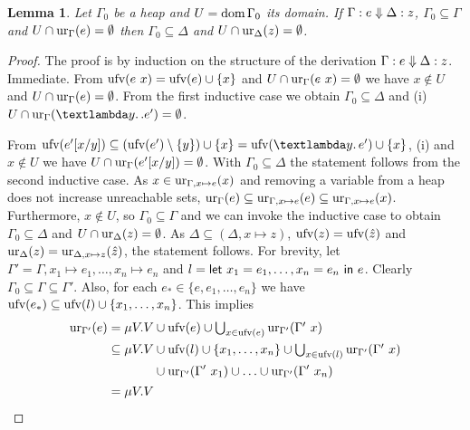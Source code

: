 \documentclass[preprint]{sigplanconf}
\newtheorem{lemma}[theorem]{Lemma}
\theoremstyle{nonumberplain}
\newtheorem{proof}{Proof}
\begin{document}
\begin{lemma}
Let $\Gamma_0$ be a heap and $U= \text{dom}\,\Gamma_0$ its domain. If $\Gamma : e \Downarrow \Delta : z$, $\Gamma_0 \subseteq \Gamma$ and $U \cap \text{ur}_{\Gamma}(e) = \emptyset$ then $\Gamma_0 \subseteq \Delta$ and  $U \cap \text{ur}_{\Delta}(z)=\emptyset$.
\label{lem:deepdup}
\end{lemma}
\begin{proof}
The proof is by induction on the structure of the derivation $\Gamma : e \Downarrow \Delta : z$.
Immediate.
From $\text{ufv}(e\ x) = \text{ufv}(e) \cup \{x\}$ and $U \cap \text{ur}_{\Gamma}(e\ x)= \emptyset$ we have $x\notin U$ and $U \cap \text{ur}_{\Gamma}(e) = \emptyset$. From the first inductive case we obtain $\Gamma_0 \subseteq \Delta$ and (i) $U \cap \ur\Gamma {\sLam y. e'}= \emptyset$.

From $\ufv{e'[x/y]} \subseteq (\ufv{e'}\setminus \{y\}) \cup \{x\} = \ufv{\sLam ye'} \cup \{x\}$, (i) and $x\notin U$ we have $U \cap \text{ur}_{\Gamma}(e'[x/y]) = \emptyset$. With $\Gamma_0 \subseteq \Delta$ the statement follows from the second inductive case.
As $x \in \text{ur}_{\Gamma,x \mapsto e}(x)$ and removing a variable from a heap does not increase unreachable sets, $\text{ur}_{\Gamma}(e) \subseteq \text{ur}_{\Gamma, x\mapsto e}(e) \subseteq \text{ur}_{\Gamma,x\mapsto e}(x)$. Furthermore, $x \notin U$, so $\Gamma_0 \subseteq \Gamma$ and we can invoke the inductive case to obtain $\Gamma_0 \subseteq \Delta$ and $U \cap \text{ur}_{\Delta}(z) = \emptyset$. As $\Delta \subseteq (\Delta, x \mapsto z)$, $\text{ufv}(z) = \text{ufv}(\hat z)$ and $\text{ur}_{\Delta}(z) = \text{ur}_{\Delta, x \mapsto z}(\hat z)$, the statement follows.
For brevity, let $\Gamma' = \Gamma,x_1\mapsto e_1,\ldots,x_n\mapsto e_n$ and $l = \text{\textsf{let}}\ x_1=e_1,\ldots,x_n=e_n\ \text{\textsf{in}}\ e$.
Clearly $\Gamma_0 \subseteq \Gamma \subseteq \Gamma'$.
Also, for each $e_* \in \{e,e_1,\ldots,e_n\}$ we have $\text{ufv}(e_*) \subseteq \text{ufv}(l) \cup \{x_1,\ldots,x_n\}$. This implies 
\begin{align*}
\ur{\Gamma'}e
&= \mu V. V \cup \ufv e \cup \textstyle\bigcup_{x\in \ufv e}\ur{\Gamma'}{\Gamma'\ x} \\
&\subseteq \mu V. V
\begin{aligned}[t]
&\cup \ufv l \cup \{x_1,\ldots,x_n\} \cup \textstyle\bigcup_{x\in \ufv l}\ur{\Gamma'}{\Gamma'\ x} \\
&\cup \ur{\Gamma'}{\Gamma'\ x_1} \cup \ldots \cup \ur{\Gamma'}{\Gamma'\ x_n}
\end{aligned}\\
&= \mu V. V
\begin{aligned}[t]

\end{aligned}
\end{align*}
\end{proof}
\end{document}
